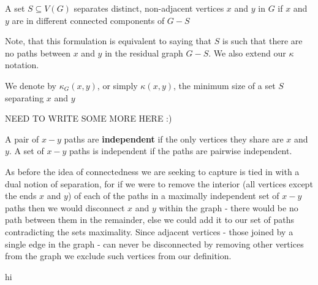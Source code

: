 \begin{defn}
A set $S \subseteq V(G)$ separates distinct, non-adjacent vertices $x$ and $y$ in $G$ if $x$ and $y$ are in different connected components of $G - S$
\end{defn}

Note, that this formulation is equivalent to saying that $S$ is such that there are no paths between $x$ and $y$ in the residual graph $G-S$. We also extend our $\kappa$ notation.

\begin{notat}
We denote by $\kappa_G(x,y)$, or simply $\kappa(x,y)$, the minimum size of a set $S$ separating $x$ and $y$
\end{notat} 

NEED TO WRITE SOME MORE HERE :)

\begin{defn}
A pair of $x-y$ paths are \textbf{independent} if the only vertices they share are $x$ and $y$. A set of $x-y$ paths is independent if the paths are pairwise independent.
\end{defn}

As before the idea of connectedness we are seeking to capture is tied in with a dual notion of separation, for if we were to remove the interior (all vertices except the ends $x$ and $y$) of each of the paths in a maximally independent set of $x-y$ paths then we would disconnect $x$ and $y$ within the graph - there would be no path between them in the remainder, else we could add it to our set of paths contradicting the sets maximality. Since adjacent vertices - those joined by a single edge in the graph - can never be disconnected by removing other vertices from the graph we exclude such vertices from our definition. 

\begin{notat}
hi
\end{notat}



\newpage



